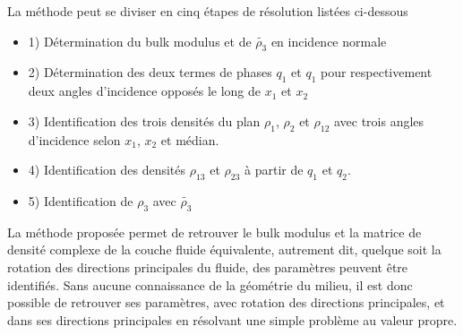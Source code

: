\documentclass[12pt]{report}
\begin{document}
    La méthode peut se diviser en cinq étapes de résolution listées ci-dessous 
    \begin{itemize}
        \item 1) Détermination du bulk modulus et de $\tilde{\rho_3}$ en incidence normale
        \item 2) Détermination des deux termes de phases $q_1$ et $q_1$ pour respectivement deux angles d'incidence opposés le long de $x_1$ et $x_2$
        \item 3) Identification des trois densités du plan $\rho_1$, $\rho_2$ et $\rho_{12}$ avec trois angles d'incidence selon $x_1$, $x_2$ et médian.
        \item 4) Identification des densités $\rho_{13}$ et $\rho_{23}$ à partir de $q_1$ et $q_2$.
        \item 5) Identification de $\rho_3$ avec $\tilde{\rho_3}$
    \end{itemize}
    
    La méthode proposée permet de retrouver le bulk modulus et la matrice de densité complexe de la couche fluide équivalente, autrement dit, quelque soit la rotation des directions principales du fluide, des paramètres peuvent être identifiés. Sans aucune connaissance de la géométrie du milieu, il est donc possible de retrouver ses paramètres, avec rotation des directions principales, et dans ses directions principales en résolvant une simple problème au valeur propre.  
    
    
    
    
\end{document}
